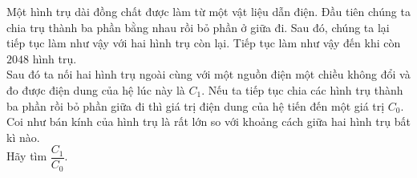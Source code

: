     
    \begin{vd}
    Một hình trụ dài đồng chất được làm từ một vật liệu dẫn điện. Đầu tiên chúng ta chia trụ thành ba phần bằng nhau rồi bỏ phần ở giữa đi. Sau đó, chúng ta lại tiếp tục làm như vậy với hai hình trụ còn lại. Tiếp tục làm như vậy đến khi còn $2048$ hình trụ. \\
    Sau đó ta nối hai hình trụ ngoài cùng với một nguồn điện một chiều không đổi và đo được điện dung của hệ lúc này là $C_1$. Nếu ta tiếp tục chia các hình trụ thành ba phần rồi bỏ phần giữa đi thì giá trị điện dung của hệ tiến đến một giá trị $C_0$. 
    Coi như bán kính của hình trụ là rất lớn so với khoảng cách giữa hai hình trụ bất kì nào.\\
    Hãy tìm $\displaystyle\dfrac{C_1}{C_0}$.
     \begin{center}
\begin{tikzpicture}[x=0.75pt,y=0.75pt,yscale=-1,xscale=1]


\end{tikzpicture}
\end{center}
\end{vd}
